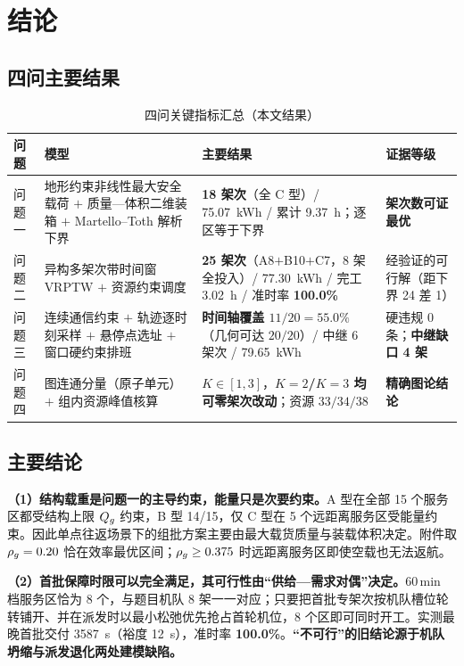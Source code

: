 \section{结论}

\subsection{四问主要结果}

\begin{table}[htbp]
	\caption{四问关键指标汇总（本文结果）}
	\label{tab:allmetrics}
	\centering
	\begin{tabular}{p{1.5cm}p{4.0cm}p{5.0cm}p{3.6cm}}
		\toprule
		问题 & 模型 & 主要结果 & 证据等级 \\
		\midrule
		问题一
		& 地形约束非线性最大安全载荷 $+$ 质量—体积二维装箱 $+$ Martello--Toth 解析下界
		& \textbf{18 架次}（全 C 型）/ \SI{75.07}{kWh} / 累计 \SI{9.37}{h}；逐区等于下界
		& \textbf{架次数可证最优} \\
		问题二
		& 异构多架次带时间窗 VRPTW $+$ 资源约束调度
		& \textbf{25 架次}（A8$+$B10$+$C7，8 架全投入）/ \SI{77.30}{kWh} / 完工 \SI{3.02}{h} / 准时率 \textbf{100.0\%}
		& 经验证的可行解（距下界 24 差 1） \\
		问题三
		& 连续通信约束 $+$ 轨迹逐时刻采样 $+$ 悬停点选址 $+$ 窗口硬约束排班
		& \textbf{时间轴覆盖 $11/20=55.0\%$}（几何可达 $20/20$）/ 中继 6 架次 / \SI{79.65}{kWh}
		& 硬违规 0 条；\textbf{中继缺口 4 架} \\
		问题四
		& 图连通分量（原子单元）$+$ 组内资源峰值核算
		& $K\in[1,3]$，\textbf{$K=2$/$K=3$ 均可零架次改动}；资源 $33/34/38$
		& \textbf{精确图论结论} \\
		\bottomrule
	\end{tabular}
\end{table}

\subsection{主要结论}

\textbf{（1）结构载重是问题一的主导约束，能量只是次要约束。}A 型在全部 15 个服务区都受结构上限 $Q_{g}$ 约束，B 型 14/15，仅 C 型在 5 个远距离服务区受能量约束。因此单点往返场景下的组批方案主要由最大载货质量与装载体积决定。附件取 $\rho_{g}=0.20$ 恰在效率最优区间；$\rho_{g}\ge0.375$ 时远距离服务区即使空载也无法返航。

\textbf{（2）首批保障时限可以完全满足，其可行性由“供给—需求对偶”决定。}60\,min 档服务区恰为 8 个，与题目机队 8 架一一对应；只要把首批专架次按机队槽位轮转铺开、并在派发时以最小松弛优先抢占首轮机位，8 个区即可同时开工。实测最晚首批交付 \SI{3587}{s}（裕度 \SI{12}{s}），准时率 \textbf{100.0\%}。\textbf{“不可行”的旧结论源于机队坍缩与派发退化两处建模缺陷。}

